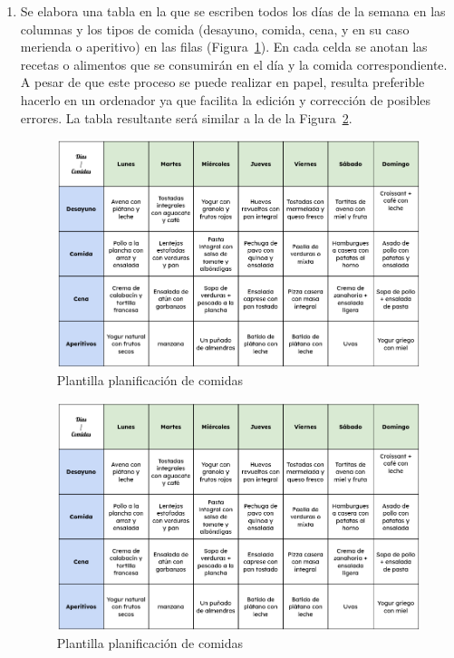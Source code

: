 \documentclass[12pt,a4paper]{report} %
\begin{document}
	\begin{enumerate}
		\item Se elabora una tabla en la que se escriben todos los días de la semana en las columnas y los tipos de comida (desayuno, comida, cena, y en su caso merienda o aperitivo) en las filas  (Figura~\ref{fig:Plantillamealplan}). En cada celda se anotan las recetas o alimentos que se consumirán en el día y la comida correspondiente. A pesar de que este proceso se puede realizar en papel, resulta preferible hacerlo en un ordenador ya que facilita la edición y corrección de posibles errores. La tabla resultante será similar a la de la Figura~\ref{fig:Plantillamealplanrellenada}.
		
		\begin{figure}[H]
			\centering
			\includegraphics[width=1\textwidth]{./PlantillaMealPlanningRellenada.png}
			\caption{Plantilla planificación de comidas}
			\label{fig:Plantillamealplan}
		\end{figure}	
	
		\begin{figure}[H]
			\centering
			\includegraphics[width=1\textwidth]{./PlantillaMealPlanningRellenada.png}
			\caption{Plantilla planificación de comidas}
			\label{fig:Plantillamealplanrellenada}
		\end{figure}	
		

\end{enumerate}
\end{document}
